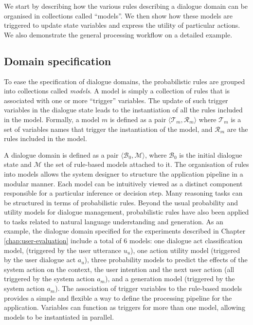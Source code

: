 We start by describing how the various rules describing a dialogue domain can be organised in collections called ``models''. We then show how these models are triggered to update state variables and express the utility of particular actions. We also demonstrate the general processing workflow on a detailed example. 


\subsection{Domain specification}

To ease the specification of dialogue domains, the probabilistic rules are grouped into collections called \textit{models}.  A model is simply a collection of rules that is associated with one or more ``trigger'' variables.  The update of such trigger variables in the dialogue state leads to the instantiation of all the rules included in the model. Formally, a model $m$ is defined as a pair $\langle \mathcal{T}_m, \mathcal{R}_m \rangle$ where $\mathcal{T}_m$ is a set of variables names that trigger the instantiation of the model, and $\mathcal{R}_m$ are the rules included in the model.

A dialogue domain is defined as a pair $\langle \mathcal{B}_0, \mathcal{M} \rangle$, where $\mathcal{B}_0$ is the initial dialogue state  and $\mathcal{M}$ the set of rule-based models attached to it. The organisation of rules into models allows the system designer to structure the application pipeline in a modular manner. Each model can be intuitively viewed as a distinct component responsible for a particular inference or decision step. Many reasoning tasks can be structured in terms of probabilistic rules.  Beyond the usual probability and utility models for dialogue management, probabilistic rules have also been applied to tasks related to natural language understanding and generation.  As an example, the dialogue domain specified for the experiments described in Chapter \ref{chap:user-evaluation} include a total of 6 models: one dialogue act classification model, (triggered by the user utterance $u_u$), one action utility model (triggered by the user dialogue act $a_u$), three probability models to predict the effects of the system action on the context, the user intention and the next user action (all triggered by the system action $a_m$), and a generation model (triggered by the system action $a_m$).  The association of trigger variables to the rule-based models provides a simple and flexible a way to define the processing pipeline for the application.  Variables can function as triggers for more than one model, allowing models to be instantiated in parallel.

